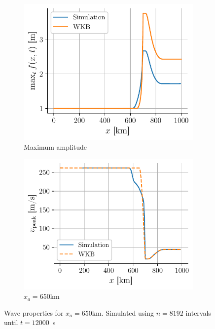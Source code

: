 \begin{figure}[h]
    \centering
    \begin{subfigure}{0.48\linewidth}
        \centering
        \includegraphics[width=\linewidth]{figures/corail_eq1_amplitude_xa=650000.0.pdf}
        \caption{Maximum amplitude}
        \label{fig:corail_eq1_amplitude_xa=65km}
    \end{subfigure}
    \begin{subfigure}{0.48\linewidth}
        \centering
        \includegraphics[width=\linewidth]{figures/corail_eq1_vitesse_xa=650000.0.pdf}
        \caption{\(x_a = 650\)km}
        \label{fig:corail_eq1_speed_xa=65km}
    \end{subfigure}
    \caption{Wave properties for \(x_a = 650\)km. Simulated using \(n=8192\) intervals until \hbox{\(t=12000\) \si{\second}}}
\end{figure}


